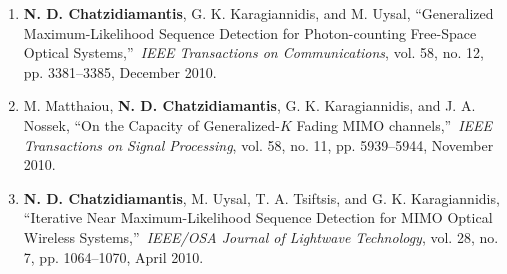 \documentclass[11pt]{article}
\begin{document}
\begin{enumerate}
\item \textbf{N. D. Chatzidiamantis}, G. K. Karagiannidis, and M. Uysal, \textquotedblleft Generalized
Maximum-Likelihood Sequence Detection for Photon-counting Free-Space Optical Systems,\textquotedblright\
\emph{IEEE Transactions on Communications}, vol. 58, no. 12, pp. 3381--3385, December 2010.

\item M. Matthaiou, \textbf{N. D. Chatzidiamantis}, G. K. Karagiannidis, and J. A. Nossek,
\textquotedblleft On the Capacity of Generalized-$K$ Fading MIMO channels,\textquotedblright\
\emph{IEEE Transactions on Signal Processing}, vol. 58, no. 11, pp. 5939--5944, November 2010.
\item \textbf{N. D. Chatzidiamantis}, M. Uysal, T. A. Tsiftsis, and G. K. Karagiannidis,
\textquotedblleft Iterative Near Maximum-Likelihood Sequence Detection for MIMO Optical Wireless
Systems,\textquotedblright\ \emph{IEEE/OSA Journal of Lightwave Technology}, vol. 28, no. 7, pp. 1064--1070, April
2010.
\end{enumerate}
\end{document}
